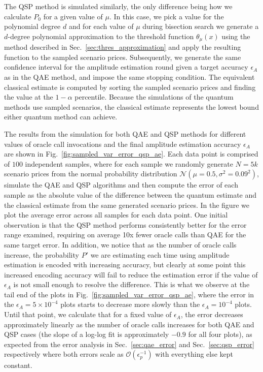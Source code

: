 \begin{enumerate}
The QSP method is simulated similarly, the only difference being how we calculate $P_0$ for a given value of $\mu$.
In this case, we pick a value for the polynomial degree $d$ and for each value of $\mu$ during bisection search we generate a $d$-degree polynomial approximation to the threshold function $\theta_{\mu}(x)$ using the method described in Sec.~\ref{sec:thres_approximation} and apply the resulting function to the sampled scenario prices.
Subsequently, we generate the same confidence interval for the amplitude estimation round given a target accuracy $\epsilon_A$ as in the QAE method, and impose the same stopping condition.
The equivalent classical estimate is computed by sorting the sampled scenario prices and finding the value at the $1-\alpha$ percentile.
Because the simulations of the quantum methods use sampled scenarios, the classical estimate represents the lowest bound either quantum method can achieve.

The results from the simulation for both QAE and QSP methods for different values of oracle call invocations and the final amplitude estimation accuracy $\epsilon_A$ are shown in Fig.~\ref{fig:sampled_var_error_qsp_ae}.
Each data point is comprised of $100$ independent samples, where for each sample we randomly generate $N=5k$ scenario prices from the normal probability distribution $\mathcal{N}(\mu=0.5, \sigma^2=0.09^2)$, simulate the QAE and QSP algorithms and then compute the error of each sample as the absolute value of the difference between the quantum \var{} estimate and the classical \var{} estimate from the same generated scenario prices.
In the figure we plot the average error across all samples for each data point.
One initial observation is that the QSP method performs consistently better for the error range examined, requiring on average 10x fewer oracle calls than QAE for the same target error.
In addition, we notice that as the number of oracle calls increase, the probability $P'$ we are estimating each time using amplitude estimation is encoded with increasing accuracy, but clearly at some point this increased encoding accuracy will fail to reduce the \var{} estimation error if the value of $\epsilon_A$ is not small enough to resolve the difference.
This is what we observe at the tail end of the plots in Fig.~\ref{fig:sampled_var_error_qsp_ae}, where the \var{} error in the $\epsilon_A=5\times 10^{-4}$ plots starts to decrease more slowly than the $\epsilon_A= 10^{-4}$ plots.
Until that point, we calculate that for a fixed value of $\epsilon_A$, the \var{} error decreases approximately linearly as the number of oracle calls increases for both QAE and QSP cases (the slope of a log-log fit is approximately $-0.9$ for all four plots), as expected from the error analysis in Sec.~\ref{sec:qae_error} and Sec.~\ref{sec:qsp_error} respectively where both errors scale as $\mathcal{O}(\epsilon^{-1}_p)$ with everything else kept constant.


\end{enumerate}

